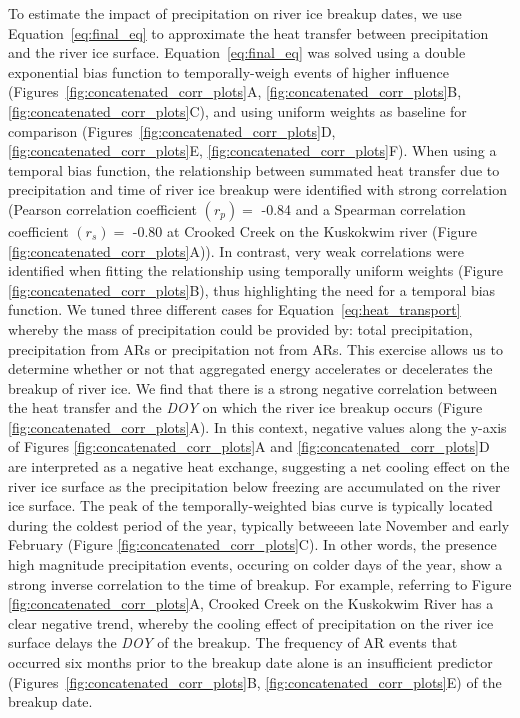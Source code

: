 \documentclass[12pts,draft]{AR_analysis_}
\begin{document}
To estimate the impact of precipitation on river ice breakup dates, we use 
Equation~\ref{eq:final_eq} to approximate the heat transfer
between precipitation and the river ice surface.
Equation~\ref{eq:final_eq} was solved using a double exponential bias
function to temporally-weigh events of higher influence 
(Figures~\ref{fig:concatenated_corr_plots}A, 
\ref{fig:concatenated_corr_plots}B, 
\ref{fig:concatenated_corr_plots}C), and using
uniform weights as baseline for comparison 
(Figures~\ref{fig:concatenated_corr_plots}D, 
\ref{fig:concatenated_corr_plots}E,
\ref{fig:concatenated_corr_plots}F).
When using a temporal bias function, the relationship between summated
heat transfer due to precipitation and time of river ice breakup were
identified with strong correlation (Pearson correlation coefficient
$(r_{p} )=$ -0.84 and a Spearman correlation coefficient
$(r_{s}) =$ -0.80 at Crooked Creek on the Kuskokwim river
(Figure \ref{fig:concatenated_corr_plots}A)).
In contrast, very weak correlations were identified when fitting the
relationship using temporally uniform weights (Figure
\ref{fig:concatenated_corr_plots}B), thus highlighting the need
for a temporal bias function. We tuned three different cases for 
Equation~\ref{eq:heat_transport} whereby the mass of precipitation 
could be provided by: total precipitation, precipitation from ARs or 
precipitation not from ARs. 
This exercise allows us to 
determine whether or not that aggregated 
energy accelerates or decelerates the breakup of river ice. 
We find that there is a strong negative correlation between the heat 
transfer and the \emph{DOY} 
on which the river ice breakup occurs (Figure
\ref{fig:concatenated_corr_plots}A). In this context, negative values 
along the y-axis of Figures \ref{fig:concatenated_corr_plots}A and 
\ref{fig:concatenated_corr_plots}D 
are interpreted
as a negative heat exchange, suggesting a net cooling effect on the river ice
surface as the precipitation below freezing are accumulated
on the river ice surface. The
peak of the temporally-weighted bias curve is typically located during
the coldest period of the year, typically betweeen late November and
early February (Figure {\ref{fig:concatenated_corr_plots}}C).
In other words, the presence high magnitude precipitation events, occuring 
on colder days of the 
year, show a strong inverse correlation to the time of breakup. 
For example, referring to Figure \ref{fig:concatenated_corr_plots}A, 
Crooked Creek on the 
Kuskokwim River has a
clear negative trend, whereby the cooling effect of precipitation on the
river ice surface delays the \emph{DOY} of the breakup. 
The frequency of AR events that occurred six months prior to
the breakup date alone is an insufficient predictor
(Figures~\ref{fig:concatenated_corr_plots}B,
\ref{fig:concatenated_corr_plots}E) of the breakup date. 
\end{document}
